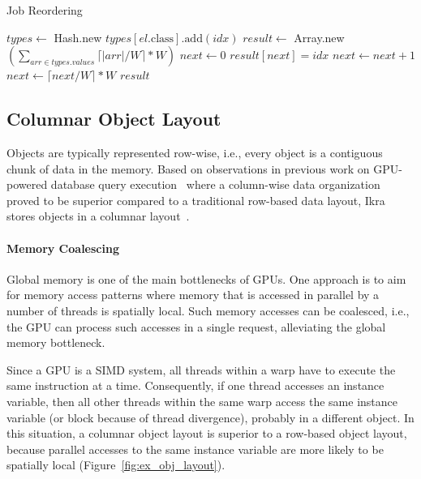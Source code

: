 \documentclass[preprint]{sigplanconf}
\begin{document}
\begin{algorithm}
\caption{Job Reordering}
\label{CHalgorithm}
\begin{algorithmic}[1]
\State $\mathit{types} \gets$ Hash.new
    \State $\mathit{types}[\mathit{el}.\mbox{class}].\mbox{add}(\mathit{idx})$
\EndFor
\State $\mathit{result} \gets$ Array.new$(\sum_{\mathit{arr} \in \mathit{types}.\mathit{values}} \lceil |\mathit{arr}| / W \rceil * W)$
\State $\mathit{next} \gets 0$
        \State $\mathit{result}[\mathit{next}] = \mathit{idx}$
        \State $\mathit{next} \gets \mathit{next} + 1$
    \EndFor
    \State $\mathit{next} \gets \lceil \mathit{next} / W \rceil * W$
\EndFor
\State \Return $\mathit{result}$
\EndProcedure
\end{algorithmic}
\end{algorithm}


\subsection{Columnar Object Layout}
Objects are typically represented row-wise, i.e., every object is a contiguous chunk of data in the memory. Based on observations in previous work on GPU-powered database query execution~\cite{Bakkum:2010:ASD:1735688.1735706} where a column-wise data organization proved to be superior compared to a traditional row-based data layout, Ikra stores objects in a columnar layout~\cite{Mattis:2015:COI:2814228.2814230}.

\paragraph{Memory Coalescing}
Global memory is one of the main bottlenecks of GPUs. One approach is to aim for memory access patterns where memory that is accessed in parallel by a number of threads is spatially local. Such memory accesses can be coalesced, i.e., the GPU can process such accesses in a single request, alleviating the global memory bottleneck.

Since a GPU is a SIMD system, all threads within a warp have to execute the same instruction at a time. Consequently, if one thread accesses an instance variable, then all other threads within the same warp access the same instance variable (or block because of thread divergence), probably in a different object. In this situation, a columnar object layout is superior to a row-based object layout, because parallel accesses to the same instance variable are more likely to be spatially local (Figure~\ref{fig:ex_obj_layout}).
\end{document}
